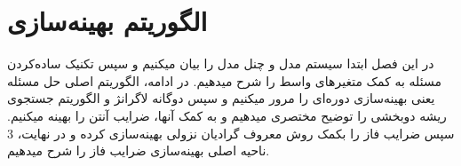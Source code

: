 \chapter{الگوریتم بهینه‌سازی}
در این فصل ابتدا سیستم مدل و چنل مدل را بیان میکنیم و سپس تکنیک ساده‌کردن مسئله به کمک متغیرهای واسط را شرح میدهیم. در ادامه، الگوریتم اصلی حل مسئله یعنی بهینه‌سازی دوره‌ای را مرور میکنیم و سپس دوگانه لاگرانژ و الگوریتم جستجوی ریشه دوبخشی را توضیح مختصری میدهیم و به کمک آنها، ضرایب آنتن را بهینه میکنیم. سپس ضرایب فاز را بکمک روش معروف گرادیان نزولی بهینه‌سازی کرده و در نهایت، 3 ناحیه اصلی بهینه‌سازی ضرایب فاز را شرح میدهیم. 
\newpage


\newpage
‌